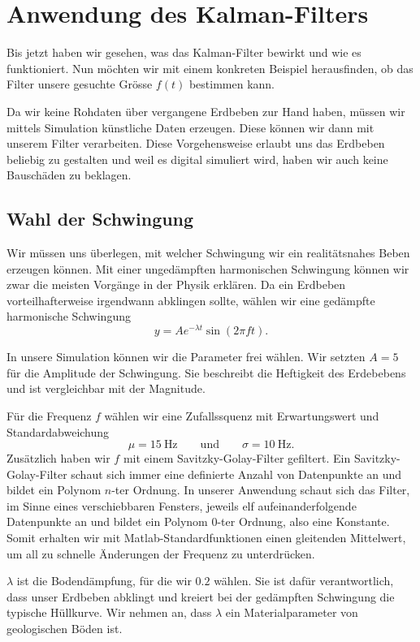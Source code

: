 \section{Anwendung des Kalman-Filters}
Bis jetzt haben wir gesehen, was das Kalman-Filter bewirkt und wie es funktioniert.
Nun möchten wir mit einem konkreten Beispiel herausfinden,
ob das Filter unsere gesuchte Grösse $f(t)$ bestimmen kann.

Da wir keine Rohdaten über vergangene Erdbeben zur Hand haben,
müssen wir mittels Simulation künstliche Daten erzeugen.
Diese können wir dann mit unserem Filter verarbeiten.
Diese Vorgehensweise erlaubt uns das Erdbeben beliebig zu gestalten
und weil es digital simuliert wird, haben wir auch keine Bauschäden zu beklagen.

\subsection{Wahl der Schwingung}
Wir müssen uns überlegen, mit welcher Schwingung wir ein realitätsnahes Beben erzeugen können.
Mit einer ungedämpften harmonischen Schwingung können wir zwar die meisten Vorgänge in der Physik erklären.
Da ein Erdbeben vorteilhafterweise irgendwann abklingen sollte,
wählen wir eine gedämpfte harmonische Schwingung
\begin{equation}
  y = A e^{-\lambda t} \sin(2\pi f t).
\end{equation}

In unsere Simulation können wir die Parameter frei wählen.
Wir setzten $A = 5$ für die Amplitude der Schwingung.
Sie beschreibt die Heftigkeit des Erdebebens und ist vergleichbar mit der Magnitude.

Für die Frequenz $f$ wählen wir eine Zufallssquenz mit Erwartungswert und Standardabweichung
\begin{equation}
  \mu = \SI{15}{\hertz}
  \qquad\text{und}\qquad
  \sigma = \SI{10}{\hertz}.
\end{equation}
Zusätzlich haben wir $f$ mit einem Savitzky-Golay-Filter gefiltert.
Ein Savitzky-Golay-Filter schaut sich immer eine definierte Anzahl von Datenpunkte an
und bildet ein Polynom $n$-ter Ordnung.
In unserer Anwendung schaut sich das Filter, im Sinne eines verschiebbaren Fensters,
jeweils elf aufeinanderfolgende Datenpunkte an und bildet ein Polynom $0$-ter Ordnung,
also eine Konstante.
Somit erhalten wir mit Matlab-Standardfunktionen einen gleitenden Mittelwert,
um all zu schnelle Änderungen der Frequenz zu unterdrücken.

$\lambda$ ist die Bodendämpfung, für die wir $0.2$ wählen.
Sie ist dafür verantwortlich, dass unser Erdbeben abklingt
und kreiert bei der gedämpften Schwingung die typische Hüllkurve.
Wir nehmen an, dass $\lambda$ ein Materialparameter von geologischen Böden ist.

